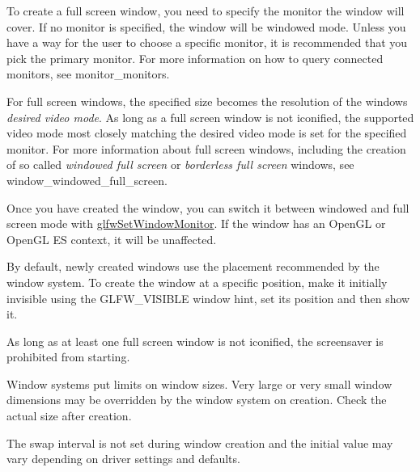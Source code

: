 To create a full screen window, you need to specify the monitor the window will cover. If no monitor is specified, the window will be windowed mode. Unless you have a way for the user to choose a specific monitor, it is recommended that you pick the primary monitor. For more information on how to query connected monitors, see monitor\+\_\+monitors.

For full screen windows, the specified size becomes the resolution of the window\textquotesingle{}s {\itshape desired video mode}. As long as a full screen window is not iconified, the supported video mode most closely matching the desired video mode is set for the specified monitor. For more information about full screen windows, including the creation of so called {\itshape windowed full screen} or {\itshape borderless full screen} windows, see window\+\_\+windowed\+\_\+full\+\_\+screen.

Once you have created the window, you can switch it between windowed and full screen mode with \hyperlink{group__window_ga12fabf78575e59c00f822f323ae0b6ae}{glfw\+Set\+Window\+Monitor}. If the window has an Open\+GL or Open\+GL ES context, it will be unaffected.

By default, newly created windows use the placement recommended by the window system. To create the window at a specific position, make it initially invisible using the G\+L\+F\+W\+\_\+\+V\+I\+S\+I\+B\+LE window hint, set its position and then show it.

As long as at least one full screen window is not iconified, the screensaver is prohibited from starting.

Window systems put limits on window sizes. Very large or very small window dimensions may be overridden by the window system on creation. Check the actual size after creation.

The swap interval is not set during window creation and the initial value may vary depending on driver settings and defaults.


